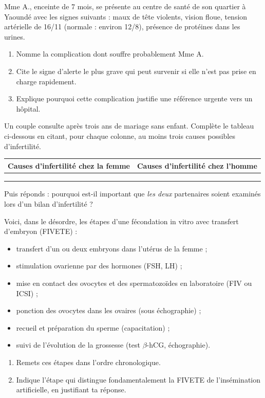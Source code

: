 \documentclass[11pt]{article}
\begin{document}
\begin{exercice}
Mme A., enceinte de 7 mois, se présente au centre de santé de son quartier à Yaoundé avec les signes suivants : maux de tête violents, vision floue, tension artérielle de 16/11 (normale : environ 12/8), présence de protéines dans les urines.
\begin{enumerate}
\item Nomme la complication dont souffre probablement Mme A.
\item Cite le signe d'alerte le plus grave qui peut survenir si elle n'est pas prise en charge rapidement.
\item Explique pourquoi cette complication justifie une référence urgente vers un hôpital.
\end{enumerate}
\end{exercice}

\begin{exercice}
Un couple consulte après trois ans de mariage sans enfant. Complète le tableau ci-dessous en citant, pour chaque colonne, au moins trois causes possibles d'infertilité.
\begin{center}
\begin{tabularx}{\linewidth}{|X|X|}
\hline
\rowcolor{popblueL} \textbf{Causes d'infertilité chez la femme} & \textbf{Causes d'infertilité chez l'homme} \\
\hline
 & \\
\hline
 & \\
\hline
 & \\
\hline
\end{tabularx}
\end{center}
Puis réponds : pourquoi est-il important que \emph{les deux} partenaires soient examinés lors d'un bilan d'infertilité ?
\end{exercice}

\begin{exercice}
Voici, dans le désordre, les étapes d'une fécondation in vitro avec transfert d'embryon (FIVETE) :
\begin{itemize}
\item[a.] transfert d'un ou deux embryons dans l'utérus de la femme ;
\item[b.] stimulation ovarienne par des hormones (FSH, LH) ;
\item[c.] mise en contact des ovocytes et des spermatozoïdes en laboratoire (FIV ou ICSI) ;
\item[d.] ponction des ovocytes dans les ovaires (sous échographie) ;
\item[e.] recueil et préparation du sperme (capacitation) ;
\item[f.] suivi de l'évolution de la grossesse (test $\beta$-hCG, échographie).
\end{itemize}
\begin{enumerate}
\item Remets ces étapes dans l'ordre chronologique.
\item Indique l'étape qui distingue fondamentalement la FIVETE de l'insémination artificielle, en justifiant ta réponse.
\end{enumerate}
\end{exercice}
\end{document}
